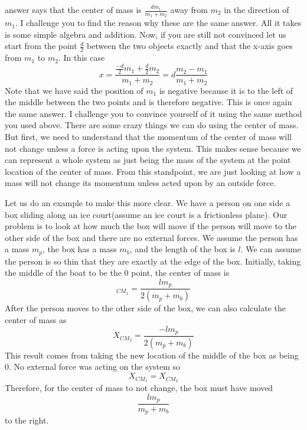 \documentclass{article}[gray]
\numberwithin{equation}{subsection}
\begin{document}
answer says that the center of mass is $\frac{dm_1}{m_1+m_2}$ away from $m_2$ in the direction of $m_1$. I challenge you to find the reason why these are the same answer. All it takes is some simple algebra and addition. Now, if you are still not convinced let us start from the point $\frac{d}{2}$ between the two objects exactly and that the x-axis goes from $m_1$ to $m_2$.  In this case \begin{equation}x=\frac{\frac{-d}{2}m_1+\frac{d}{2}m_2}{m_1+m_2}=d\frac{m_2-m_1}{m_1+m_2}\end{equation} Note that we have said the position of $m_1$ is negative because it is to the left of the middle between the two points and is therefore negative. This is once again the same answer. I challenge you to convince yourself of it using the same method you used above. There are some crazy things we can do using the center of mass. But first, we need to understand that the momentum of the center of mass will not change unless a force is acting upon the system. This makes sense because we can represent a whole system as just being the mass of the system at the point location of the center of mass. From this standpoint, we are just looking at how a mass will not change its momentum unless acted upon by an outside force. 

Let us do an example to make this more clear. We have a person on one side a box sliding along an ice court(assume an ice court is a frictionless plane). Our problem is to look at how much the box will move if the person will move to the other side of the box and there are no external forces. We assume the person has a mass $m_p$, the box has a mass $m_b$, and the length of the box is $l$. We can assume the person is so thin that they are exactly at the edge of the box. Initially, taking the middle of the boat to be the 0 point, the center of mass is \begin{equation}_{CM_1} = \frac{lm_p}{2\left(m_p+m_b\right)}\end{equation} After the person moves to the other side of the box, we can also calculate the center of mass as \begin{equation}X_{CM_2} = \frac{-lm_p}{2\left(m_p+m_b\right)}\end{equation} This result comes from taking the new location of the middle of the box as being 0. No external force was acting on the system so $$X_{CM_1}=X_{CM_2}$$ Therefore, for the center of mass to not change, the box must have moved $$\frac{lm_p}{m_p+m_b}$$ to the right.
\end{document}
